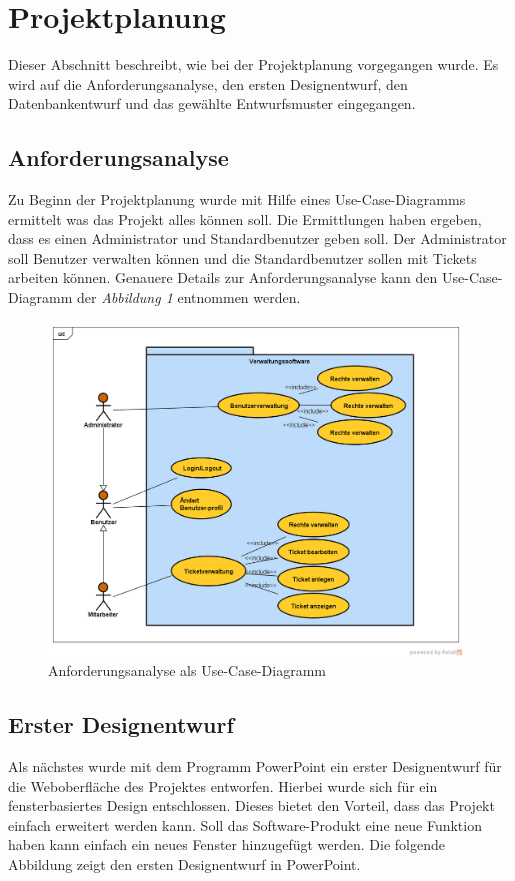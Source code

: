 \documentclass[12pt, a4paper]{article}
\begin{document}
\section{Projektplanung}
Dieser Abschnitt beschreibt, wie bei der Projektplanung vorgegangen wurde. Es wird auf die  Anforderungsanalyse, den ersten Designentwurf, den Datenbankentwurf und das gewählte Entwurfsmuster eingegangen.

\subsection{Anforderungsanalyse}
Zu Beginn der Projektplanung wurde mit Hilfe eines Use-Case-Diagramms ermittelt was das Projekt alles können soll. Die Ermittlungen haben ergeben, dass es einen Administrator und Standardbenutzer geben soll. Der Administrator soll Benutzer verwalten können und die Standardbenutzer sollen mit Tickets arbeiten können. Genauere Details zur Anforderungsanalyse kann den Use-Case-Diagramm der \textit{Abbildung 1} entnommen werden.

\begin{figure}[H]
	\begin{center}
	\includegraphics[width=110mm]{Bilder/UseCaseAnforderungsanalyse.png}
	\end{center}
	\caption{Anforderungsanalyse als Use-Case-Diagramm}
\end{figure}

\subsection{Erster Designentwurf}

Als nächstes wurde mit dem Programm PowerPoint ein erster Designentwurf für die Weboberfläche des Projektes entworfen. Hierbei wurde sich für ein fensterbasiertes Design entschlossen. Dieses bietet den Vorteil, dass das Projekt einfach erweitert werden kann. Soll das Software-Produkt eine neue Funktion haben kann einfach ein neues Fenster hinzugefügt werden. Die folgende Abbildung zeigt den ersten Designentwurf in PowerPoint.
\end{document}
